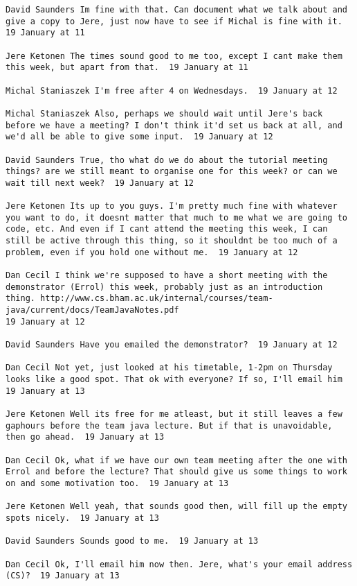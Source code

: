 \begin{verbatim}
David Saunders Im fine with that. Can document what we talk about and
give a copy to Jere, just now have to see if Michal is fine with it.
19 January at 11

Jere Ketonen The times sound good to me too, except I cant make them
this week, but apart from that.  19 January at 11

Michal Staniaszek I'm free after 4 on Wednesdays.  19 January at 12

Michal Staniaszek Also, perhaps we should wait until Jere's back
before we have a meeting? I don't think it'd set us back at all, and
we'd all be able to give some input.  19 January at 12

David Saunders True, tho what do we do about the tutorial meeting
things? are we still meant to organise one for this week? or can we
wait till next week?  19 January at 12

Jere Ketonen Its up to you guys. I'm pretty much fine with whatever
you want to do, it doesnt matter that much to me what we are going to
code, etc. And even if I cant attend the meeting this week, I can
still be active through this thing, so it shouldnt be too much of a
problem, even if you hold one without me.  19 January at 12

Dan Cecil I think we're supposed to have a short meeting with the
demonstrator (Errol) this week, probably just as an introduction
thing. http://www.cs.bham.ac.uk/internal/courses/team-java/current/docs/TeamJavaNotes.pdf
19 January at 12

David Saunders Have you emailed the demonstrator?  19 January at 12

Dan Cecil Not yet, just looked at his timetable, 1-2pm on Thursday
looks like a good spot. That ok with everyone? If so, I'll email him
19 January at 13

Jere Ketonen Well its free for me atleast, but it still leaves a few
gaphours before the team java lecture. But if that is unavoidable,
then go ahead.  19 January at 13

Dan Cecil Ok, what if we have our own team meeting after the one with
Errol and before the lecture? That should give us some things to work
on and some motivation too.  19 January at 13

Jere Ketonen Well yeah, that sounds good then, will fill up the empty
spots nicely.  19 January at 13

David Saunders Sounds good to me.  19 January at 13

Dan Cecil Ok, I'll email him now then. Jere, what's your email address
(CS)?  19 January at 13


\end{verbatim}
